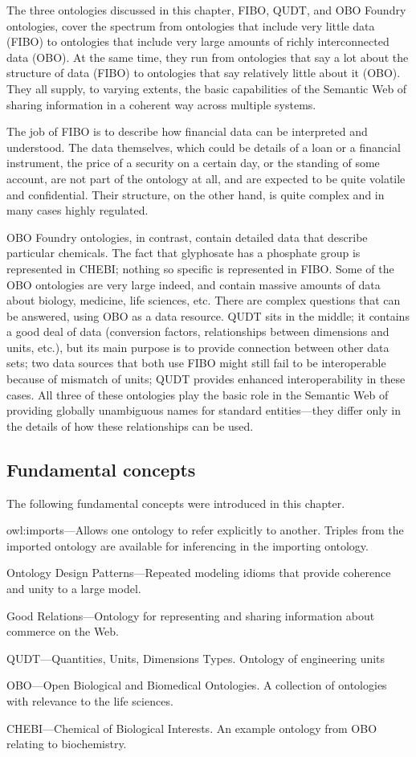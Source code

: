 The three ontologies discussed in this chapter, FIBO, QUDT,
and OBO Foundry ontologies, cover the spectrum from ontologies that
include very little data (FIBO) to ontologies that
include very large amounts of richly interconnected data (OBO). 
At the same time, they run from ontologies that say a lot about the 
structure of data (FIBO) to ontologies that say relatively little about 
it (OBO). 
They all
supply, to varying extents, the basic capabilities of the Semantic Web
of sharing information in a coherent way across multiple systems.

The job of FIBO is to describe how financial data can be interpreted and 
understood.  The data themselves, which could be details of a loan or a 
financial instrument, the price of a security on a certain day, 
or the standing of some account, are not part of the ontology at all, 
and are expected to be quite volatile and confidential.  Their structure, 
on the other hand, is quite complex and in many cases highly regulated. 

OBO Foundry
ontologies, in contrast, contain detailed data that describe particular 
chemicals.  The fact that glyphosate has a phosphate group is represented 
in CHEBI; nothing so specific is represented in FIBO. 
Some of the OBO ontologies are very large indeed, and contain massive
amounts of data about biology, medicine, life sciences, etc. There are
complex questions that can be answered, using OBO as a data resource.
QUDT sits in the middle; it contains a good deal of data (conversion
factors, relationships between dimensions and units, etc.), but its main
purpose is to provide connection between other data sets; two data
sources that both use FIBO might still fail to be
interoperable because of mismatch of units; QUDT provides enhanced
interoperability in these cases. All three of these ontologies play the
basic role in the Semantic Web of providing globally unambiguous names
for standard entities---they differ only in the details of how these
relationships can be used.

\subsection{Fundamental concepts}

The following fundamental concepts were introduced in this chapter.

owl:imports---Allows one ontology to refer explicitly to another.
Triples from the imported ontology are available for inferencing in the
importing ontology.

Ontology Design Patterns---Repeated modeling idioms that provide
coherence and unity to a large model.

Good Relations---Ontology for representing and sharing information about
commerce on the Web.

QUDT---Quantities, Units, Dimensions Types. Ontology of engineering
units

OBO---Open Biological and Biomedical Ontologies. A collection of
ontologies with relevance to the life sciences.

CHEBI---Chemical of Biological Interests. An example ontology from OBO
relating to biochemistry.
